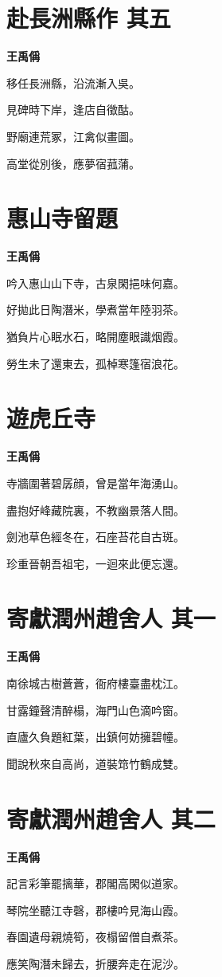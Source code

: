 \documentclass[12pt,a4paper]{ctexbook}
\begin{document}
\section{赴長洲縣作  其五}
\textbf{王禹偁}\par\vspace{0.5em}
移任長洲縣，沿流漸入吳。\par
見碑時下岸，逢店自徵酤。\par
野廟連荒冢，江禽似畫圖。\par
高堂從別後，應夢宿菰蒲。\par

\section{惠山寺留題}
\textbf{王禹偁}\par\vspace{0.5em}
吟入惠山山下寺，古泉閑挹味何嘉。\par
好拋此日陶潛米，學煮當年陸羽茶。\par
猶負片心眠水石，略開塵眼識烟霞。\par
勞生未了還東去，孤棹寒篷宿浪花。\par

\section{遊虎丘寺}
\textbf{王禹偁}\par\vspace{0.5em}
寺牆圍著碧孱顔，曾是當年海湧山。\par
盡抱好峰藏院裏，不教幽景落人間。\par
劍池草色經冬在，石座苔花自古斑。\par
珍重晉朝吾祖宅，一迴來此便忘還。\par

\section{寄獻潤州趙舍人  其一}
\textbf{王禹偁}\par\vspace{0.5em}
南徐城古樹蒼蒼，衙府樓臺盡枕江。\par
甘露鐘聲清醉榻，海門山色滴吟窗。\par
直廬久負題紅葉，出鎮何妨擁碧幢。\par
聞說秋來自高尚，道裝筇竹鶴成雙。\par

\section{寄獻潤州趙舍人  其二}
\textbf{王禹偁}\par\vspace{0.5em}
記言彩筆罷摛華，郡閣高閑似道家。\par
琴院坐聽江寺磬，郡樓吟見海山霞。\par
春園遺母親燒筍，夜榻留僧自煮茶。\par
應笑陶潛未歸去，折腰奔走在泥沙。\par
\end{document}
